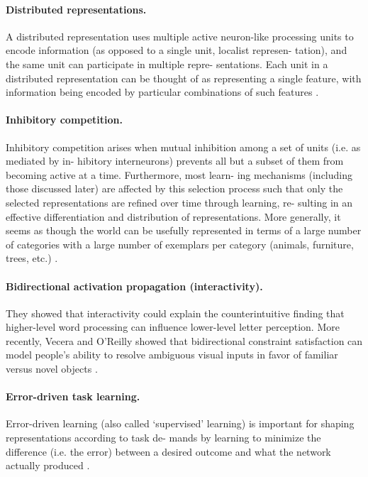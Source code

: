 \paragraph{Distributed representations.} A distributed representation
uses multiple active neuron-like processing units to encode
information (as opposed to a single unit, localist represen-
tation), and the same unit can participate in multiple repre-
sentations. Each unit in a distributed representation can be
thought of as representing a single feature, with information
being encoded by particular combinations of such features \cite{hinton1988learning}.

\paragraph{Inhibitory competition.} Inhibitory competition arises when mutual
inhibition among a set of units (i.e. as mediated by in-
hibitory interneurons) prevents all but a subset of them
from becoming active at a time.  Furthermore, most learn-
ing mechanisms (including those discussed later) are
affected by this selection process such that only the selected
representations are refined over time through learning, re-
sulting in an effective differentiation and distribution of
representations. More generally, it seems as though the world can be usefully
represented in terms of a large number of categories with a
large number of exemplars per category (animals, furniture,
trees, etc.) \cite{hinton1988learning}. 

\paragraph{Bidirectional activation propagation (interactivity).} They showed that
interactivity could explain the counterintuitive finding that
higher-level word processing can influence lower-level letter
perception. More recently, Vecera and O’Reilly showed
that bidirectional constraint satisfaction can model people’s
ability to resolve ambiguous visual inputs in favor of familiar
versus novel objects \cite{hinton1988learning}. 

\paragraph{Error-driven task learning.} Error-driven learning (also called ‘supervised’ learning) is
important for shaping representations according to task de-
mands by learning to minimize the difference (i.e. the error)
between a desired outcome and what the network actually
produced \cite{hinton1988learning}. 

